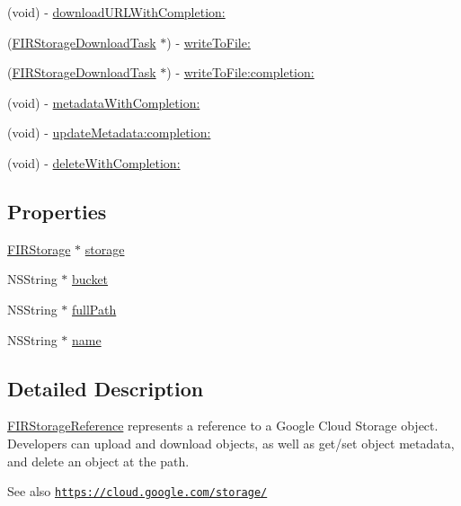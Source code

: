 \begin{DoxyCompactItemize}
\item 
(void) -\/ \hyperlink{interface_f_i_r_storage_reference_a535cb5c7d1437344a58e4154295a4b3e}{download\+U\+R\+L\+With\+Completion\+:}
\item 
(\hyperlink{interface_f_i_r_storage_download_task}{F\+I\+R\+Storage\+Download\+Task} $\ast$) -\/ \hyperlink{interface_f_i_r_storage_reference_a279d136ad125f375b5e2b03556a1cef3}{write\+To\+File\+:}
\item 
(\hyperlink{interface_f_i_r_storage_download_task}{F\+I\+R\+Storage\+Download\+Task} $\ast$) -\/ \hyperlink{interface_f_i_r_storage_reference_a52c091145b0c44c2475046d88455e43d}{write\+To\+File\+:completion\+:}
\item 
(void) -\/ \hyperlink{interface_f_i_r_storage_reference_a42458fbbef8c4525abd80ada33ede4de}{metadata\+With\+Completion\+:}
\item 
(void) -\/ \hyperlink{interface_f_i_r_storage_reference_ab994cb5cf0a171160378a0f0265c81f6}{update\+Metadata\+:completion\+:}
\item 
(void) -\/ \hyperlink{interface_f_i_r_storage_reference_afeca37f6983cf72c9e5546f1ac2f6578}{delete\+With\+Completion\+:}
\end{DoxyCompactItemize}
\subsection*{Properties}
\begin{DoxyCompactItemize}
\item 
\hyperlink{interface_f_i_r_storage}{F\+I\+R\+Storage} $\ast$ \hyperlink{interface_f_i_r_storage_reference_a7441bb92a62af97dfdecbefbe9999180}{storage}
\item 
N\+S\+String $\ast$ \hyperlink{interface_f_i_r_storage_reference_a685333b75b9c800611cea278dcfe06b5}{bucket}
\item 
N\+S\+String $\ast$ \hyperlink{interface_f_i_r_storage_reference_a8af04c7ca02e65c37f50713efe697e49}{full\+Path}
\item 
N\+S\+String $\ast$ \hyperlink{interface_f_i_r_storage_reference_a46b7942007399f60156d1ba6cfd0b089}{name}
\end{DoxyCompactItemize}


\subsection{Detailed Description}
\hyperlink{interface_f_i_r_storage_reference}{F\+I\+R\+Storage\+Reference} represents a reference to a Google Cloud Storage object. Developers can upload and download objects, as well as get/set object metadata, and delete an object at the path. \begin{DoxySeeAlso}{See also}
\href{https://cloud.google.com/storage/}{\tt https\+://cloud.\+google.\+com/storage/} 
\end{DoxySeeAlso}


